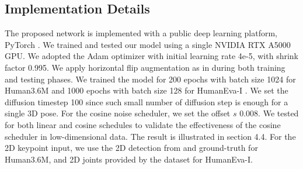 \documentclass[letterpaper, 10 pt, conference]{ieeeconf}
\begin{document}
\subsection{Implementation Details}
The proposed network is implemented with a public deep learning platform, PyTorch \cite{paszke2019pytorch}.
We trained and tested our model using a single NVIDIA RTX A5000 GPU.
We adopted the Adam \cite{kingma2014adam} optimizer with initial learning rate 4e-5, with shrink factor 0.995.
We apply horizontal flip augmentation as in \cite{chen2020anatomy, Liu_2020_CVPR, pavllo20193d} during both training and testing phases.
We trained the model for 200 epochs with batch size 1024 for Human3.6M \cite{ionescu2013human3} and 1000 epochs with batch size 128 for HumanEva-I \cite{sigal2010humaneva}.
We set the diffusion timestep 100 since such small number of diffusion step is enough for a single 3D pose.
For the cosine noise scheduler, we set the offset $s$ 0.008.
We tested for both linear and cosine schedules to validate the effectiveness of the cosine scheduler in low-dimensional data.
The result is illustrated in section 4.4.
For the 2D keypoint input, we use the 2D detection from \cite{sun2019deep} and ground-truth for Human3.6M, and 2D joints provided by the dataset for HumanEva-I.
\end{document}
